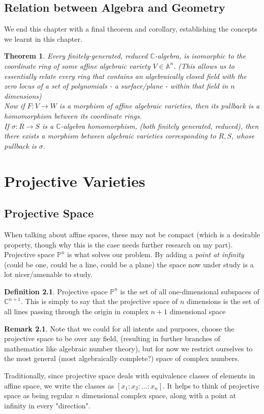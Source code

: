 \documentclass[12pt]{book}
\newtheorem{theorem}{Theorem}[chapter]
\theoremstyle{definition}
\newtheorem*{definition}{Definition}
\newtheorem*{remark}{Remark}
\begin{document}
\section{Relation between Algebra and Geometry}
We end this chapter with a final theorem and corollary, establishing the concepts we learnt in this chapter.
\begin{theorem}
    Every \textit{finitely-generated, reduced} $\mathbb{C}$-algebra, is isomorphic to the coordinate ring of some affine algebraic variety $V \in \mathbb{A}^n$. (This allows us to essentially relate every ring that contains an algebraically closed field with the zero locus of a set of polynomials - a surface/plane - within that field in $n$ dimensions) \\
    Now if $F: V \to W$ is a morphism of affine algebraic varieties, then its pullback is a homomorphism between its coordinate rings.\\
    If $\sigma: R \to S$ is a $\mathbb{C}$-algebra homomorphism, (both finitely generated, reduced), then there exists a morphism between algebraic varieties corresponding to $R, S$, whose pullback is $\sigma$.
\end{theorem}
\chapter{Projective Varieties}
\section{Projective Space}
When talking about affine spaces, these may not be compact (which is a desirable property, though why this is the case needs further research on my part). Projective space $\mathbb{P}^n$ is what solves our problem. By adding a \textit{point at infinity} (could be one, could be a line, could be a plane) the space now under study is a lot nicer/amenable to study.

\begin{definition}
    Projective space $\mathbb{P}^n$ is the set of all one-dimensional subspaces of $\mathbb{C}^{n+1}$. This is simply to say that the projective space of $n$ dimensions is the set of all lines passing through the origin in complex $n+1$ dimensional space
\end{definition}
\begin{remark}
    Note that we could for all intents and purposes, choose the projective space to be over any field, (resulting in further branches of mathematics like algebraic number theory), but for now we restrict ourselves to the most general (most algebraically complete?) space of complex numbers.
\end{remark}
Traditionally, since projective space deals with equivalence classes of elements in affine space, we write the classes as $[x_1:x_2:\ldots:x_n]$. It helps to think of projective space as being regular $n$ dimensional complex space, along with a point at infinity in every "direction".
\end{document}
